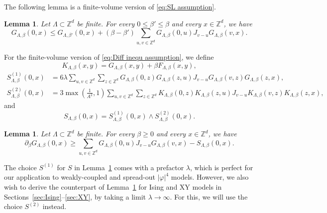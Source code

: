 \documentclass[11pt,a4paper]{article}
\numberwithin{equation}{section}
\theoremstyle{plain}
\newtheorem{Lem}[Thm]{Lemma}
\theoremstyle{definition}
\newcommand\1{\mathds{1}}
\begin{document}
The following lemma is a finite-volume version of \eqref{eq:SL assumption}.


\begin{Lem}\label{lem:finite volume finite diff} Let $\Lambda\subset \mathbb Z^d$ be  finite. For every $0\leq \beta'\leq \beta$ and every $x\in \mathbb Z^d$, we have
\begin{equation}\label{eq:phi4G finite}
	G_{\Lambda,\beta}(0,x)
    \leq G_{\Lambda,\beta'}(0,x)
    +(\beta-\beta')\sum_{u,v\in \mathbb Z^d}G_{\Lambda,\beta}(0,u)J_{v-u}G_{\Lambda,\beta}(v,x).
    \end{equation}
\end{Lem}

For the finite-volume version of \eqref{eq:Diff inequ assumption}, we
define
\begin{equation}
    K_{\Lambda,\beta}(x, y) = G_{\Lambda,\beta}(x, y) + \beta F_{\Lambda,\beta}(x, y),
\end{equation}
\begin{align}
	S^{(1)}_{\Lambda,\beta}(0,x)&=
6\lambda \sum_{u,v\in \mathbb Z^d}
\sum_{z\in \mathbb Z^d} G_{\Lambda,\beta}(0,z)G_{\Lambda,\beta}(z,u)J_{v-u}G_{\Lambda,\beta}(v,z)G_{\Lambda,\beta}(z,x),
\\
	S^{(2)}_{\Lambda,\beta}(0,x)&=
3
\max \left(\frac{1}{A^2},1\right)
\sum_{u,v\in \mathbb Z^d}
\sum_{z\in \mathbb Z^d} K_{\Lambda,\beta}(0,z)K_{\Lambda,\beta}(z,u)J_{v-u}K_{\Lambda,\beta}(v,z)K_{\Lambda,\beta}(z,x),
\end{align}
and
\begin{equation}
    S_{\Lambda,\beta}(0,x)=S^{(1)}_{\Lambda,\beta}(0,x)\wedge S^{(2)}_{\Lambda,\beta}(0,x).
\end{equation}

\begin{Lem}\label{lem:finite volume lower diff inequ} Let $\Lambda\subset \mathbb Z^d$ be  finite. For every $\beta\geq 0$ and every $x\in \mathbb Z^d$, we have
\begin{equation}
\label{eq:phi4lb}
	\partial_\beta G_{\Lambda,\beta}(0,x)\geq \sum_{u,v\in \mathbb Z^d}G_{\Lambda,\beta}(0,u)J_{v-u}G_{\Lambda,\beta}(v,x)-S_{\Lambda,\beta}(0,x).
\end{equation}
\end{Lem}

The choice $S^{(1)}$ for $S$ in Lemma~\ref{lem:finite volume lower diff inequ}
comes with a prefactor $\lambda$, which is perfect for our application to weakly-coupled and spread-out $|\varphi|^4$ models.  However, we also wish to derive the counterpart of
Lemma~\ref{lem:finite volume lower diff inequ} for Ising and XY models in
Sections~\ref{sec:Ising}--\ref{sec:XY}, by taking a limit $\lambda \to \infty$.
For this, we will use the choice $S^{(2)}$ instead.
\end{document}
